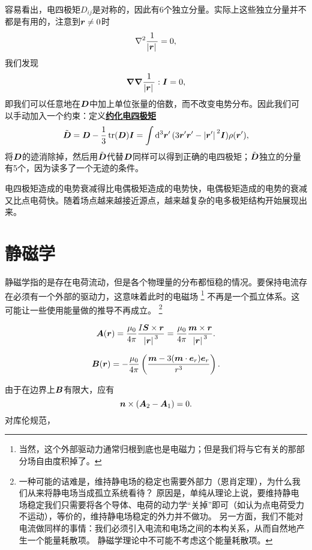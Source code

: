 \documentclass[UTF8, a4paper]{ctexart}
\newcommand*{\concept}[1]{\underline{\textbf{#1}}}
\begin{document}
容易看出，电四极矩$D_{ij}$是对称的，因此有6个独立分量。实际上这些独立分量并不都是有用的，注意到$\vb*{r} \neq 0$时
\[
    \laplacian{\frac{1}{\abs*{\vb*{r}}}} = 0,
\]
我们发现
\[
    \grad{\grad{\frac{1}{\abs*{\vb*{r}}}}} : \vb*{I} = 0,
\]
即我们可以任意地在$\vb*{D}$中加上单位张量的倍数，而不改变电势分布。因此我们可以手动加入一个约束：定义\concept{约化电四极矩}
\begin{equation}
    \tilde{\vb*{D}} = \vb*{D} - \frac{1}{3} \trace(\vb*{D}) \vb*{I} = \int \dd[3]{\vb*{r}'} (3 \vb*{r}' \vb*{r}' - \abs*{\vb*{r}'}^2 \vb*{I}) \rho(\vb*{r}') ,
\end{equation}
将$\vb*{D}$的迹消除掉，然后用$\tilde{\vb*{D}}$代替$\vb*{D}$同样可以得到正确的电四极矩；$\tilde{\vb*{D}}$独立的分量有5个，因为读多了一个无迹的条件。

电四极矩造成的电势衰减得比电偶极矩造成的电势快，电偶极矩造成的电势的衰减又比点电荷快。随着场点越来越接近源点，越来越复杂的电多极矩结构开始展现出来。

\section{静磁学}

静磁学指的是存在电荷流动，但是各个物理量的分布都恒稳的情况。要保持电流存在必须有一个外部的驱动力，这意味着此时的电磁场%
\footnote{
    当然，这个外部驱动力通常归根到底也是电磁力；但是我们将与它有关的那部分场自由度积掉了。
}%
不再是一个孤立体系。这可能让一些使用能量做的推导不再成立。%
\footnote{
    一种可能的诘难是，维持静电场的稳定也需要外部力（恩肖定理），为什么我们从来将静电场当成孤立系统看待？
    原因是，单纯从理论上说，要维持静电场稳定我们只需要将各个导体、电荷的动力学“关掉”即可（如认为点电荷受力不运动），等价的，维持静电场稳定的外力并不做功。
    另一方面，我们不能对电流做同样的事情：我们必须引入电流和电场之间的本构关系，从而自然地产生一个能量耗散项。
    静磁学理论中不可能不考虑这个能量耗散项。
}%

\begin{equation}
    \vb*{A}(\vb*{r}) = \frac{\mu_0}{4\pi} \frac{I \vb*{S} \times \vb*{r}}{\abs*{\vb*{r}}^3} = \frac{\mu_0}{4\pi} \frac{\vb*{m} \times \vb*{r}}{\abs*{\vb*{r}}^3}.
\end{equation}

\begin{equation}
    \vb*{B}(\vb*{r}) = - \frac{\mu_0}{4\pi} \left( \frac{\vb*{m} - 3 (\vb*{m} \cdot \vb*{e}_r) \vb*{e}_r}{r^3} \right).
\end{equation}

由于在边界上$\vb*{B}$有限大，应有
\begin{equation}
    \vb*{n} \times (\vb*{A}_2 - \vb*{A}_1) = 0.
\end{equation}
对库伦规范，
\end{document}

